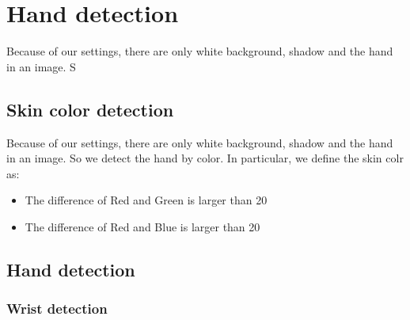 \section{Hand detection}
Because of our settings, there are only white background, shadow and the hand in an image\cite{ra11}.
S
\subsection{Skin color detection}
Because of our settings, there are only white background, shadow and the hand in an image.
So we detect the hand by color. 
In particular, we define the skin colr as:
\begin{itemize}
  \item The difference of Red and Green is larger than 20
  \item The difference of Red and Blue is larger than 20
 \end{itemize}
\subsection{Hand detection}

\subsubsection{Wrist detection}
